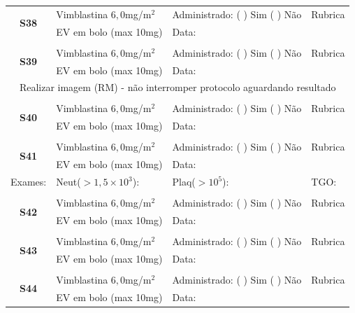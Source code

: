 \documentclass[11pt,a4paper,oldfontcommands]{memoir}
\begin{document}
\begin{center}
\begin{table}[H]
\begin{tabular}{p{}p{}|p{}|p{3cm}}
    \\
    \hline
    \multicolumn{1}{c|}{\multirow{2}{*}{\textbf{S38}}}&{Vimblastina \(6,0\)mg/m\(^2\)}&{Administrado: (  ) Sim (  ) Não}&{Rubrica}\\
    \multicolumn{1}{c|}{}&{EV em bolo (max 10mg)}&{Data:}&\\
    \hline
    \\
    \hline
    \multicolumn{1}{c|}{\multirow{2}{*}{\textbf{S39}}}&{Vimblastina \(6,0\)mg/m\(^2\)}&{Administrado: (  ) Sim (  ) Não}&{Rubrica}\\
    \multicolumn{1}{c|}{}&{EV em bolo (max 10mg)}&{Data:}&\\
   \hline
   \multicolumn{4}{c}{Realizar imagem (RM) - não interromper protocolo aguardando resultado}\\
    \hline
    \\
    \hline
    \multicolumn{1}{c|}{\multirow{2}{*}{\textbf{S40}}}&{Vimblastina \(6,0\)mg/m\(^2\)}&{Administrado: (  ) Sim (  ) Não}&{Rubrica}\\
    \multicolumn{1}{c|}{}&{EV em bolo (max 10mg)}&{Data:}&\\
    \hline
    \\
    \hline
    \multicolumn{1}{c|}{\multirow{2}{*}{\textbf{S41}}}&{Vimblastina \(6,0\)mg/m\(^2\)}&{Administrado: (  ) Sim (  ) Não}&{Rubrica}\\
    \multicolumn{1}{c|}{}&{EV em bolo (max 10mg)}&{Data:}&\\
    \hline
    {Exames:}&{Neut(\(>1,5\times10^3\)):}&{Plaq(\(>10^5\)):}&{TGO:}
    \\
    \hline
    \\
        \hline
    \multicolumn{1}{c|}{\multirow{2}{*}{\textbf{S42}}}&{Vimblastina \(6,0\)mg/m\(^2\)}&{Administrado: (  ) Sim (  ) Não}&{Rubrica}\\
    \multicolumn{1}{c|}{}&{EV em bolo (max 10mg)}&{Data:}&\\
    \hline
    \\
    \hline
    \multicolumn{1}{c|}{\multirow{2}{*}{\textbf{S43}}}&{Vimblastina \(6,0\)mg/m\(^2\)}&{Administrado: (  ) Sim (  ) Não}&{Rubrica}\\
    \multicolumn{1}{c|}{}&{EV em bolo (max 10mg)}&{Data:}&\\
    \hline
    \\
    \hline
    \multicolumn{1}{c|}{\multirow{2}{*}{\textbf{S44}}}&{Vimblastina \(6,0\)mg/m\(^2\)}&{Administrado: (  ) Sim (  ) Não}&{Rubrica}\\
    \multicolumn{1}{c|}{}&{EV em bolo (max 10mg)}&{Data:}&\\

\end{tabular}
\end{table}
\end{center}
\end{document}
